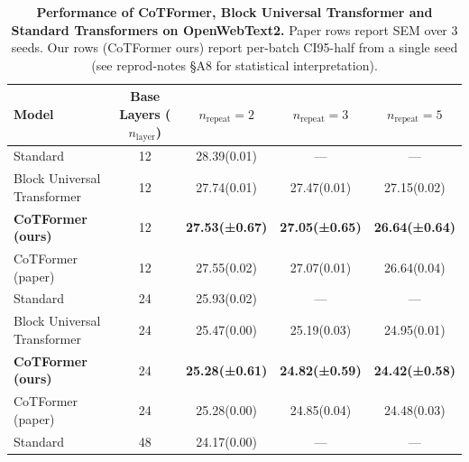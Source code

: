 \begin{table}[t]
  \centering
  \caption{\textbf{Performance of CoTFormer, Block Universal Transformer and Standard Transformers on OpenWebText2.} Paper rows report SEM over 3 seeds. Our rows (CoTFormer ours) report per-batch CI95-half from a single seed (see reprod-notes \S A8 for statistical interpretation).}
  \label{tab:table1}
  \begin{tabular}{lc ccc}
    \toprule
    Model & Base Layers ($n_{\mathrm{layer}}$) & $n_{\mathrm{repeat}}=2$ & $n_{\mathrm{repeat}}=3$ & $n_{\mathrm{repeat}}=5$ \\
    \midrule
    Standard & 12 & 28.39(0.01) & — & — \\
    Block Universal Transformer & 12 & 27.74(0.01) & 27.47(0.01) & 27.15(0.02) \\
    \textbf{CoTFormer (ours)} & 12 & \textbf{27.53(±0.67)} & \textbf{27.05(±0.65)} & \textbf{26.64(±0.64)} \\
    CoTFormer (paper) & 12 & 27.55(0.02) & 27.07(0.01) & 26.64(0.04) \\
    \midrule
    Standard & 24 & 25.93(0.02) & — & — \\
    Block Universal Transformer & 24 & 25.47(0.00) & 25.19(0.03) & 24.95(0.01) \\
    \textbf{CoTFormer (ours)} & 24 & \textbf{25.28(±0.61)} & \textbf{24.82(±0.59)} & \textbf{24.42(±0.58)} \\
    CoTFormer (paper) & 24 & 25.28(0.00) & 24.85(0.04) & 24.48(0.03) \\
    \midrule
    Standard & 48 & 24.17(0.00) & — & — \\
    \bottomrule
  \end{tabular}
\end{table}